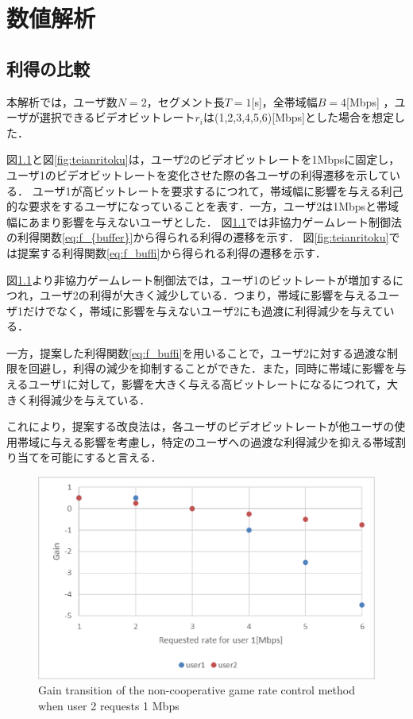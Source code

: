 \chapter{数値解析}
\section{利得の比較}
本解析では，ユーザ数$N=2$，セグメント長$T=1$[s]，全帯域幅$B = 4$[Mbps] ，ユーザが選択できるビデオビットレート$r_i$は(1,2,3,4,5,6)[Mbps]とした場合を想定した．

図\ref{fig:kisonritoku}と図\ref{fig:teianritoku}は，ユーザ2のビデオビットレートを1Mbpsに固定し，ユーザ1のビデオビットレートを変化させた際の各ユーザの利得遷移を示している．
ユーザ1が高ビットレートを要求するにつれて，帯域幅に影響を与える利己的な要求をするユーザになっていることを表す．一方，ユーザ2は1Mbpsと帯域幅にあまり影響を与えないユーザとした．
図\ref{fig:kisonritoku}では非協力ゲームレート制御法の利得関数\ref{eq:f_{buffer}}から得られる利得の遷移を示す．
図\ref{fig:teianritoku}では提案する利得関数\ref{eq:f_buffi}から得られる利得の遷移を示す．

図\ref{fig:kisonritoku}より非協力ゲームレート制御法\cite{kison}\cite{motomoto}では，ユーザ1のビットレートが増加するにつれ，ユーザ2の利得が大きく減少している．つまり，帯域に影響を与えるユーザ1だけでなく，帯域に影響を与えないユーザ2にも過渡に利得減少を与えている．

一方，提案した利得関数\ref{eq:f_buffi}を用いることで，ユーザ2に対する過渡な制限を回避し，利得の減少を抑制することができた．また，同時に帯域に影響を与えるユーザ1に対して，影響を大きく与える高ビットレートになるにつれて，大きく利得減少を与えている．

これにより，提案する改良法は，各ユーザのビデオビットレートが他ユーザの使用帯域に与える影響を考慮し，特定のユーザへの過渡な利得減少を抑える帯域割り当てを可能にすると言える．

\begin{figure}[tp]
  \centering
  \includegraphics[scale=0.45]{kison.eps}
            {Gain transition of the non-cooperative game rate control method when user 2 requests 1 Mbps}
    \label{fig:kisonritoku}
\end{figure}


